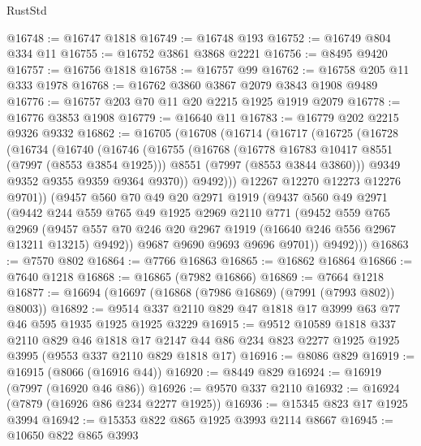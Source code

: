 \begin{lexlean}{RustStd}
\begin{coremodule}
{\begin{coremodule}
{{{{{{{{{{{{{{{{{{{{{{{{{{{{{{{{{{{{{{{{{{{@16748 := @16747 @1818
@16749 := @16748 @193
@16752 := @16749 @804 @334 @11
@16755 := @16752 @3861 @3868 @2221
@16756 := @8495 @9420
@16757 := @16756 @1818
@16758 := @16757 @99
@16762 := @16758 @205 @11 @333 @1978
@16768 := @16762 @3860 @3867 @2079 @3843 @1908 @9489
@16776 := @16757 @203 @70 @11 @20 @2215 @1925 @1919 @2079
@16778 := @16776 @3853 @1908
@16779 := @16640 @11
@16783 := @16779 @202 @2215 @9326 @9332
@16862 := @16705
    (@16708
      (@16714
        (@16717
          (@16725
            (@16728
              (@16734
                (@16740
                  (@16746
                    (@16755
                      (@16768
                        (@16778 @16783 @10417 @8551 (@7997 (@8553 @3854 @1925)))
                        @8551
                        (@7997 (@8553 @3844 @3860)))
                      @9349
                      @9352
                      @9355
                      @9359
                      @9364
                      @9370))
                  @9492)))
            @12267
            @12270
            @12273
            @12276
            @9701))
        (@9457
          @560
          @70
          @49
          @20
          @2971
          @1919
          (@9437
            @560
            @49
            @2971
            (@9442
              @244
              @559
              @765
              @49
              @1925
              @2969
              @2110
              @771
              (@9452
                @559
                @765
                @2969
                (@9457 @557 @70 @246 @20 @2967 @1919 (@16640 @246 @556 @2967 @13211 @13215) @9492))
              @9687
              @9690
              @9693
              @9696
              @9701))
          @9492)))
@16863 := @7570 @802
@16864 := @7766 @16863
@16865 := @16862 @16864
@16866 := @7640 @1218
@16868 := @16865 (@7982 @16866)
@16869 := @7664 @1218
@16877 := @16694 (@16697 (@16868 (@7986 @16869) (@7991 (@7993 @802)) @8003))
@16892 := @9514 @337 @2110 @829 @47 @1818 @17 @3999 @63 @77 @46 @595 @1935 @1925 @1925 @3229
@16915 := @9512
    @10589
    @1818
    @337
    @2110
    @829
    @46
    @1818
    @17
    @2147
    @44
    @86
    @234
    @823
    @2277
    @1925
    @1925
    @3995
    (@9553 @337 @2110 @829 @1818 @17)
@16916 := @8086 @829
@16919 := @16915 (@8066 (@16916 @44))
@16920 := @8449 @829
@16924 := @16919 (@7997 (@16920 @46 @86))
@16926 := @9570 @337 @2110
@16932 := @16924 (@7879 (@16926 @86 @234 @2277 @1925))
@16936 := @15345 @823 @17 @1925 @3994
@16942 := @15353 @822 @865 @1925 @3993 @2114 @8667
@16945 := @10650 @822 @865 @3993
}}}}}}}}}}}}}}}}}}}}}}}}}}}}}}}}}}}}}}}}}}}
\end{coremodule}}
\end{coremodule}
\end{lexlean}
